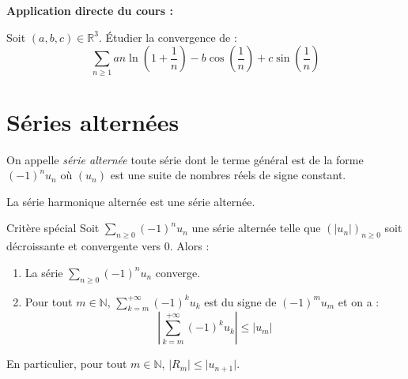 \documentclass[french,11pt,twoside]{VcCours}
\newenvironment{ApplicationDirecte}{\textbf{Application directe du cours :}

}{}
\newcommand{\Sum}[2]{\ensuremath{\textstyle{\sum\limits_{#1}^{#2}}}}
\begin{document}
\begin{ApplicationDirecte} Soit $(a,b,c) \in \mathbb{R}^3$. Étudier la convergence de :
$$ \Sum{n \geq 1}{} a n \ln \left(1 + \frac{1}{n} \right) - b \cos \left( \frac{1}{n} \right) + c \sin \left( \frac{1}{n} \right)$$
\end{ApplicationDirecte}

\section{Séries alternées}

\begin{Definition}{} On appelle \emph{série alternée} toute série dont le terme général est de la forme $(-1)^n u_n$ où $(u_n)$ est une suite de nombres réels de signe constant.
\end{Definition}

\begin{Exemple} La série harmonique alternée est une série alternée.
\end{Exemple}

\begin{Theoreme}{Critère spécial}
Soit $\Sum{n \geq 0}{} (-1)^n u_n$ une série alternée telle que $(\vert u_n \vert)_{n \geq 0}$ soit décroissante et convergente vers $0$. Alors :
\begin{enumerate}
\item La série $\Sum{n \geq 0}{} (-1)^n u_n$ converge.
\item Pour tout $m \in \mathbb{N}$, $\Sum{k=m}{+ \infty} (-1)^k u_k$ est du signe de $(-1)^m u_m$ et on a :
$$ \left\vert \sum_{k=m}^{+ \infty} (-1)^k u_k \right\vert \leq \vert u_m \vert$$
\end{enumerate}
\end{Theoreme}

\begin{Remarque}{} En particulier, pour tout $m \in \mathbb{N}$, $\vert R_m \vert \leq \vert u_{n+1} \vert$.
\end{Remarque}
\end{document}
